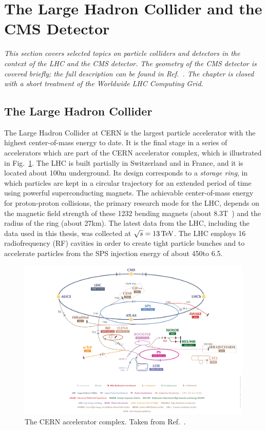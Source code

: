 \section{The Large Hadron Collider and the CMS Detector}

\emph{%
This section covers selected topics on particle colliders and detectors in the context of the LHC and the CMS detector.
% 
The geometry of the CMS detector is covered briefly; the full description can be found in Ref.~\cite{Chatrchyan:2008zzk}.
% 
The chapter is closed with a short treatment of the Worldwide LHC Computing Grid.
}


\subsection{The Large Hadron Collider}

The Large Hadron Collider at CERN is the largest particle accelerator with the highest center-of-mass energy to date.
% 
It is the final stage in a series of accelerators which are part of the CERN accelerator complex, which is illustrated in Fig.~\ref{fig:cernacceleratorcomplex}.
% 
The LHC is built partially in Switzerland and in France, and it is located about 100\unit{m} underground.
% 
Its design corresponds to a \textit{storage ring}, in which particles are kept in a circular trajectory for an extended period of time using powerful superconducting magnets.
% 
The achievable center-of-mass energy for proton-proton collisions, the primary research mode for the LHC, depends on the magnetic field strength of these 1232 bending magnets (about 8.3\unit{T}~\cite{lhc}) and the radius of the ring (about 27\unit{km}).
% 
The latest data from the LHC, including the data used in this thesis, was collected at $\sqrt{s}=13\,\text{TeV}$.
% 
The LHC employs 16 radiofrequency (RF) cavities in order to create tight particle bunches and to accelerate particles from the SPS injection energy of about 450\GeV to 6.5\TeV.


\begin{figure}[hbtp]
  \begin{center}
    \includegraphics[width=\linewidth]{img/detector/cernacceleratorcomplex_small.png}
    \caption{
        The CERN accelerator complex. Taken from Ref.~\cite{cernacceleratorcomplex}.
        }
    \label{fig:cernacceleratorcomplex}
  \end{center}
\end{figure}


